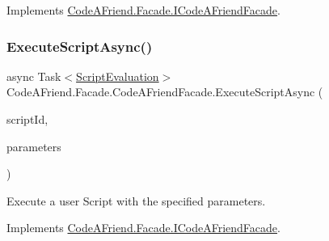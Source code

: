 Implements \mbox{\hyperlink{interface_code_a_friend_1_1_facade_1_1_i_code_a_friend_facade_a028d0f66e63a4977451e15a0a79c7f19}{Code\+A\+Friend.\+Facade.\+I\+Code\+A\+Friend\+Facade}}.

\mbox{\label{class_code_a_friend_1_1_facade_1_1_code_a_friend_facade_a04883cd14eb596a9f9113c24aa06e34b}} 
\subsubsection{\texorpdfstring{Execute\+Script\+Async()}{ExecuteScriptAsync()}\hspace{0.1cm}{\footnotesize\ttfamily [1/2]}}
{\footnotesize\ttfamily async Task$<$\mbox{\hyperlink{class_code_a_friend_1_1_data_model_1_1_script_evaluation}{Script\+Evaluation}}$>$ Code\+A\+Friend.\+Facade.\+Code\+A\+Friend\+Facade.\+Execute\+Script\+Async (\begin{DoxyParamCaption}\item[{Guid}]{script\+Id,  }\item[{\mbox{\hyperlink{class_code_a_friend_1_1_data_model_1_1_execution_parameters}{Execution\+Parameters}}}]{parameters }\end{DoxyParamCaption})}



Execute a user Script with the specified parameters. 



Implements \mbox{\hyperlink{interface_code_a_friend_1_1_facade_1_1_i_code_a_friend_facade_abd81f62f5431cd404c9503ff2cfe7e9f}{Code\+A\+Friend.\+Facade.\+I\+Code\+A\+Friend\+Facade}}.

\mbox{\label{class_code_a_friend_1_1_facade_1_1_code_a_friend_facade_abcd7e13b8e5a7accbcd56b4f7eee8934}} 
